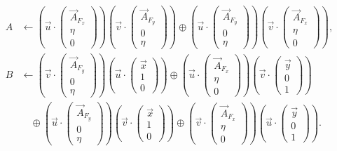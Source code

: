 \documentclass[11pt,a4paper]{article}
\theoremstyle{definition}
\theoremstyle{remark}
\begin{document}
\begin{align}
A &\leftarrow \left(\vec{u} \cdot \begin{pmatrix} \vec{A}_{F_x} \\ \eta \\ 0 \end{pmatrix}\right) \left(\vec{v} \cdot \begin{pmatrix} \vec{A}_{F_y} \\ 0 \\ \eta \end{pmatrix}\right) \oplus \left(\vec{u} \cdot \begin{pmatrix} \vec{A}_{F_y} \\ 0 \\ \eta \end{pmatrix}\right) \left(\vec{v} \cdot \begin{pmatrix} \vec{A}_{F_x} \\ \eta \\ 0 \end{pmatrix}\right), \label{eq:A-def} \\[4pt]
B &\leftarrow \left(\vec{v} \cdot \begin{pmatrix} \vec{A}_{F_y} \\ 0 \\ \eta \end{pmatrix}\right) \left(\vec{u} \cdot \begin{pmatrix} \vec{x} \\ 1 \\ 0 \end{pmatrix}\right) \oplus \left(\vec{u} \cdot \begin{pmatrix} \vec{A}_{F_x} \\ \eta \\ 0 \end{pmatrix}\right) \left(\vec{v} \cdot \begin{pmatrix} \vec{y} \\ 0 \\ 1 \end{pmatrix}\right) \nonumber \\
&\quad \oplus \left(\vec{u} \cdot \begin{pmatrix} \vec{A}_{F_y} \\ 0 \\ \eta \end{pmatrix}\right) \left(\vec{v} \cdot \begin{pmatrix} \vec{x} \\ 1 \\ 0 \end{pmatrix}\right) \oplus \left(\vec{v} \cdot \begin{pmatrix} \vec{A}_{F_x} \\ \eta \\ 0 \end{pmatrix}\right) \left(\vec{u} \cdot \begin{pmatrix} \vec{y} \\ 0 \\ 1 \end{pmatrix}\right). \label{eq:B-def}
\end{align}
\end{document}
